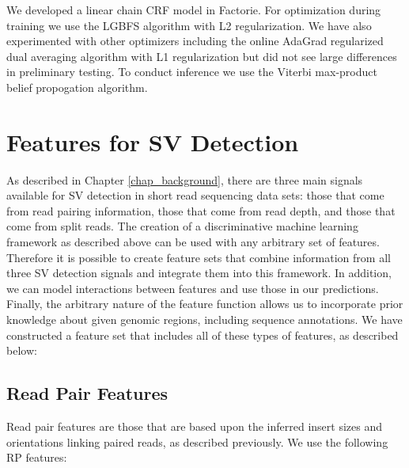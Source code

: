 

We developed a linear chain CRF model in Factorie. For optimization during training we use the LGBFS algorithm with L2 regularization. We have also experimented with other optimizers including the online AdaGrad regularized dual averaging algorithm \cite{Duchi:2011:ASM:1953048.2021068} with L1 regularization but did not see large differences in preliminary testing. To conduct inference we use the Viterbi max-product belief propogation algorithm.

\section{Features for SV Detection}

As described in Chapter \ref{chap_background}, there are three main signals available for SV detection in short read sequencing data sets: those that come from read pairing information, those that come from read depth, and those that come from split reads. The creation of a discriminative machine learning framework as described above can be used with any arbitrary set of features. Therefore it is possible to create feature sets that combine information from all three SV detection signals and integrate them into this framework. In addition, we can model interactions between features and use those in our predictions. Finally, the arbitrary nature of the feature function allows us to incorporate prior knowledge about given genomic regions, including sequence annotations. We have constructed a feature set that includes all of these types of features, as described below:

\subsection{Read Pair Features}

Read pair features are those that are based upon the inferred insert sizes and orientations linking paired reads, as described previously. We use the following RP features:


